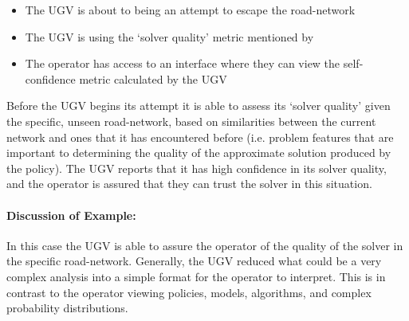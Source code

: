 \begin{itemize}
    \item The UGV is about to being an attempt to escape the road-network
    \item The UGV is using the `solver quality' metric mentioned by \citet{Aitken2016-fb}
    \item The operator has access to an interface where they can view the self-confidence metric calculated by the UGV
\end{itemize}

Before the UGV begins its attempt it is able to assess its `solver quality' given the specific, unseen road-network, based on similarities between the current network and ones that it has encountered before (i.e. problem features that are important to determining the quality of the approximate solution produced by the policy). The UGV reports that it has high confidence in its solver quality, and the operator is assured that they can trust the solver in this situation.

\paragraph{\textbf{Discussion of Example:}} In this case the UGV is able to assure the operator of the quality of the solver in the specific road-network. Generally, the UGV reduced what could be a very complex analysis into a simple format for the operator to interpret. This is in contrast to the operator viewing policies, models, algorithms, and complex probability distributions.
